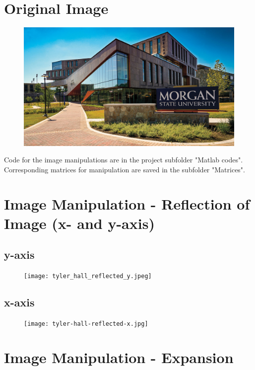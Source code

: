 \documentclass{article}
\begin{document}
\section*{Original Image}

\begin{figure}[H]
  \centering
  \includegraphics[width=1.00\textwidth]{tyler-hall.jpeg}
  \label{fig3}
\end{figure}

Code for the image manipulations are in the project subfolder "Matlab codes". Corresponding
matrices for manipulation are saved in the subfolder "Matrices". 

\section*{Image Manipulation - Reflection of Image (x- and y-axis)}

\subsection*{y-axis}

\begin{figure}[H]
  \centering
  \texttt{[image: tyler\_hall\_reflected\_y.jpeg]}
  \label{fig3}
\end{figure}

\subsection*{x-axis}

\begin{figure}[H]
  \centering
  \texttt{[image: tyler-hall-reflected-x.jpg]}
  \label{fig3}
\end{figure}


\section*{Image Manipulation - Expansion}
\end{document}
